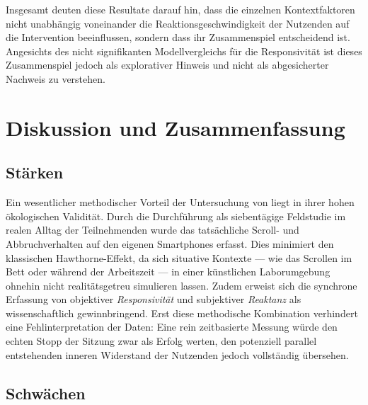 \documentclass[11pt,a4paper]{article}
\begin{document}
Insgesamt deuten diese Resultate darauf hin, dass die einzelnen Kontextfaktoren nicht
unabhängig voneinander die Reaktionsgeschwindigkeit der Nutzenden auf die Intervention
beeinflussen, sondern dass ihr Zusammenspiel entscheidend ist. Angesichts des nicht
signifikanten Modellvergleichs für die Responsivität ist dieses Zusammenspiel jedoch als
explorativer Hinweis und nicht als abgesicherter Nachweis zu verstehen.


\section{Diskussion und Zusammenfassung}
\label{sec:diskussion}

\subsection{Stärken}

Ein wesentlicher methodischer Vorteil der Untersuchung von \citet{meinhardt2025scrolling}
liegt in ihrer hohen ökologischen Validität. Durch die Durchführung als siebentägige
Feldstudie im realen Alltag der Teilnehmenden wurde das tatsächliche Scroll- und
Abbruchverhalten auf den eigenen Smartphones erfasst. Dies minimiert den klassischen
Hawthorne-Effekt, da sich situative Kontexte --- wie das Scrollen im Bett oder während der
Arbeitszeit --- in einer künstlichen Laborumgebung ohnehin nicht realitätsgetreu simulieren
lassen. Zudem erweist sich die synchrone Erfassung von objektiver \emph{Responsivität} und
subjektiver \emph{Reaktanz} als wissenschaftlich gewinnbringend. Erst diese methodische
Kombination verhindert eine Fehlinterpretation der Daten: Eine rein zeitbasierte Messung
würde den echten Stopp der Sitzung zwar als Erfolg werten, den potenziell parallel
entstehenden inneren Widerstand der Nutzenden jedoch vollständig übersehen.

\subsection{Schwächen}
\end{document}
